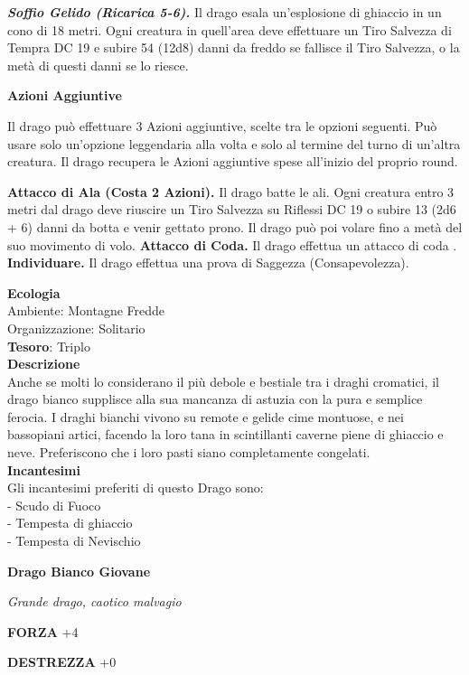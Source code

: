 \begin{multicols}{2}
\textit{\textbf{Soffio Gelido (Ricarica 5-6).}} Il drago esala un'esplosione di ghiaccio in un cono di 18 metri. Ogni creatura in quell'area deve effettuare un Tiro Salvezza di Tempra DC 19 e subire 54 (12d8) danni da freddo se fallisce il Tiro Salvezza, o la metà di questi danni se lo riesce.

\textbf{Azioni Aggiuntive}

Il drago può effettuare 3 Azioni aggiuntive, scelte tra le opzioni seguenti. Può usare solo un'opzione leggendaria alla volta e solo al termine del turno di un'altra creatura. Il drago recupera le Azioni aggiuntive spese all'inizio del proprio round.

\textbf{Attacco di Ala (Costa 2 Azioni).} Il drago batte le ali. Ogni creatura entro 3 metri dal drago deve riuscire un Tiro Salvezza su Riflessi DC 19 o subire 13 (2d6 + 6) danni da botta e venir gettato prono. Il drago può poi volare fino a metà del suo movimento di volo. \textbf{Attacco di Coda.} Il drago effettua un attacco di coda
.
\textbf{Individuare.} Il drago effettua una prova di Saggezza (Consapevolezza).

\textbf{Ecologia}\\
Ambiente: Montagne Fredde\\
Organizzazione: Solitario\\
\textbf{Tesoro}: Triplo\\
\textbf{Descrizione}\\
Anche se molti lo considerano il più debole e bestiale tra i draghi cromatici, il drago bianco supplisce alla sua mancanza di astuzia con la pura e semplice ferocia. I draghi bianchi vivono su remote e gelide cime montuose, e nei bassopiani artici, facendo la loro tana in scintillanti caverne piene di ghiaccio e neve. Preferiscono che i loro pasti siano completamente congelati.\\
\textbf{Incantesimi}\\
Gli incantesimi preferiti di questo Drago sono:\\
- Scudo di Fuoco\\
- Tempesta di ghiaccio\\
- Tempesta di Nevischio


\medskip{}\textbf{Drago Bianco Giovane}

\textit{Grande drago, caotico malvagio}

\textbf{FORZA} +4

\textbf{DESTREZZA} +0


\end{multicols}
